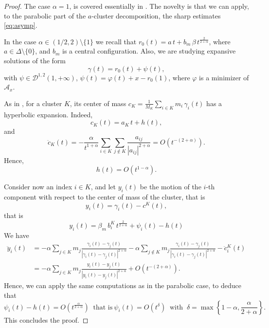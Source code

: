 \documentclass[a4paper,10pt]{amsart}
\theoremstyle{plain}
\theoremstyle{definition}
\numberwithin{equation}{section}
\numberwithin{thm}{section}
\begin{document}
\begin{proof}
    The case $\alpha=1$, is covered essentially in \cite{PolimeniTerracini}. The novelty is that we can apply, to the parabolic part of the $a$-cluster decomposition, the sharp estimates \eqref{eq:asymp}.

In the case $\alpha\in (1/2,2)\setminus\{1\}$ we recall that $r_0(t)=a\,t+b_m\,\beta\,t^{\frac{2}{2+\alpha}}$, where $a \in \Delta \setminus \{0\}$, and $b_m$ is a central configuration. Also, we are studying expansive solutions of the form
\[
\gamma(t)=r_0(t)+\psi(t),
\]
with $\psi \in \mathcal{D}^{1,2}(1,+\infty)$, $\psi(t)=\varphi(t)+x-r_0(1)$, where $\varphi$ is a minimizer of $\mathcal A_x$.

As in \cite{PolimeniTerracini}, for a cluster $K$, its center of mass $c_K=\frac1{M_K}\sum_{i\in K} m_i\,\gamma_i(t)$ has a hyperbolic expansion. Indeed,
\[
c_K(t)=a_K\,t +h(t),
\]
and
\[
\ddot c_K(t)=-\frac{\alpha}{t^{1+\alpha}}\sum_{i\in K}\sum_{j\notin K}\frac{a_{ij}}{|a_{ij}|^{2+\alpha}} =O(t^{-(2+\alpha)}).
\]
Hence,
\[
h(t)=O(t^{1-\alpha}).
\]

 Consider now an index $i\in K$, and let $y_i(t)$ be the motion of the $i$-th component with respect to the center of mass of the cluster, that is
\[
y_i(t)=\gamma_i(t)-c^K(t),
\]
that is
\[
y_i(t)=\beta_m\,b_i^K\,t^\frac{2}{2+\alpha}+\psi_i(t)-h(t)
\]
We have
\[
\begin{aligned}
    \ddot y_i(t)&=-\alpha\sum_{j\in K}m_j\frac{\gamma_i(t)-\gamma_j(t)}{|\gamma_i(t)-\gamma_j(t)|^{2+\alpha}}-\alpha\sum_{j\notin K}m_j\frac{\gamma_i(t)-\gamma_j(t)}{|\gamma_i(t)-\gamma_j(t)|^{2+\alpha}}-\ddot c_i^K(t)
    \\
    &=-\alpha\sum_{j\in K}m_j\frac{y_i(t)-y_j(t)}{|y_i(t)-y_j(t)|^{2+\alpha}}+O(t^{-(2+\alpha)}).
\end{aligned}
\]
Hence, we can apply the same computations as in the parabolic case, to deduce that
\[
\psi_i(t)-h(t)=O(t^\frac{\alpha}{2+\alpha}) \ \mbox{ that is}\ \psi_i(t)=O(t^\delta) \ \mbox{ with } \ \delta=\max\left\{1-\alpha,\frac{\alpha}{2+\alpha}\right\}.
\]
This concludes the proof.
\end{proof}



















\end{document}
